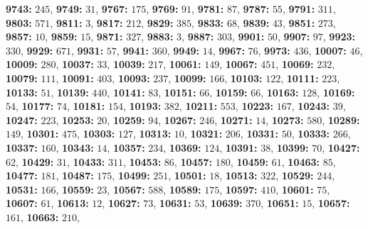 \textsf{\bfseries 9743:} $245$, \textsf{\bfseries 9749:} $31$, \textsf{\bfseries 9767:} $175$, \textsf{\bfseries 9769:} $91$, \textsf{\bfseries 9781:} $87$, \textsf{\bfseries 9787:} $55$, \textsf{\bfseries 9791:} $311$, \textsf{\bfseries 9803:} $571$, \textsf{\bfseries 9811:} $3$, \textsf{\bfseries 9817:} $212$, \textsf{\bfseries 9829:} $385$, \textsf{\bfseries 9833:} $68$, \textsf{\bfseries 9839:} $43$, \textsf{\bfseries 9851:} $273$, \textsf{\bfseries 9857:} $10$, \textsf{\bfseries 9859:} $15$, \textsf{\bfseries 9871:} $327$, \textsf{\bfseries 9883:} $3$, \textsf{\bfseries 9887:} $303$, \textsf{\bfseries 9901:} $50$, \textsf{\bfseries 9907:} $97$, \textsf{\bfseries 9923:} $330$, \textsf{\bfseries 9929:} $671$, \textsf{\bfseries 9931:} $57$, \textsf{\bfseries 9941:} $360$, \textsf{\bfseries 9949:} $14$, \textsf{\bfseries 9967:} $76$, \textsf{\bfseries 9973:} $436$, \textsf{\bfseries 10007:} $46$, \textsf{\bfseries 10009:} $280$, \textsf{\bfseries 10037:} $33$, \textsf{\bfseries 10039:} $217$, \textsf{\bfseries 10061:} $149$, \textsf{\bfseries 10067:} $451$, \textsf{\bfseries 10069:} $232$, \textsf{\bfseries 10079:} $111$, \textsf{\bfseries 10091:} $403$, \textsf{\bfseries 10093:} $237$, \textsf{\bfseries 10099:} $166$, \textsf{\bfseries 10103:} $122$, \textsf{\bfseries 10111:} $223$, \textsf{\bfseries 10133:} $51$, \textsf{\bfseries 10139:} $440$, \textsf{\bfseries 10141:} $83$, \textsf{\bfseries 10151:} $66$, \textsf{\bfseries 10159:} $66$, \textsf{\bfseries 10163:} $128$, \textsf{\bfseries 10169:} $54$, \textsf{\bfseries 10177:} $74$, \textsf{\bfseries 10181:} $154$, \textsf{\bfseries 10193:} $382$, \textsf{\bfseries 10211:} $553$, \textsf{\bfseries 10223:} $167$, \textsf{\bfseries 10243:} $39$, \textsf{\bfseries 10247:} $223$, \textsf{\bfseries 10253:} $20$, \textsf{\bfseries 10259:} $94$, \textsf{\bfseries 10267:} $246$, \textsf{\bfseries 10271:} $14$, \textsf{\bfseries 10273:} $580$, \textsf{\bfseries 10289:} $149$, \textsf{\bfseries 10301:} $475$, \textsf{\bfseries 10303:} $127$, \textsf{\bfseries 10313:} $10$, \textsf{\bfseries 10321:} $206$, \textsf{\bfseries 10331:} $50$, \textsf{\bfseries 10333:} $266$, \textsf{\bfseries 10337:} $160$, \textsf{\bfseries 10343:} $14$, \textsf{\bfseries 10357:} $234$, \textsf{\bfseries 10369:} $124$, \textsf{\bfseries 10391:} $38$, \textsf{\bfseries 10399:} $70$, \textsf{\bfseries 10427:} $62$, \textsf{\bfseries 10429:} $31$, \textsf{\bfseries 10433:} $311$, \textsf{\bfseries 10453:} $86$, \textsf{\bfseries 10457:} $180$, \textsf{\bfseries 10459:} $61$, \textsf{\bfseries 10463:} $85$, \textsf{\bfseries 10477:} $181$, \textsf{\bfseries 10487:} $175$, \textsf{\bfseries 10499:} $251$, \textsf{\bfseries 10501:} $18$, \textsf{\bfseries 10513:} $322$, \textsf{\bfseries 10529:} $244$, \textsf{\bfseries 10531:} $166$, \textsf{\bfseries 10559:} $23$, \textsf{\bfseries 10567:} $588$, \textsf{\bfseries 10589:} $175$, \textsf{\bfseries 10597:} $410$, \textsf{\bfseries 10601:} $75$, \textsf{\bfseries 10607:} $61$, \textsf{\bfseries 10613:} $12$, \textsf{\bfseries 10627:} $73$, \textsf{\bfseries 10631:} $53$, \textsf{\bfseries 10639:} $370$, \textsf{\bfseries 10651:} $15$, \textsf{\bfseries 10657:} $161$, \textsf{\bfseries 10663:} $210$, 
